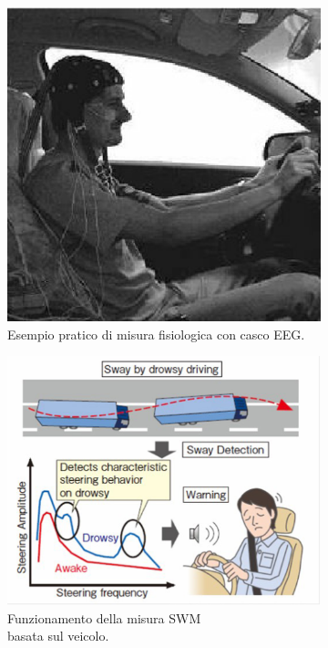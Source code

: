 \documentclass[12pt]{article}
\begin{document}
\begin{figure}
	\begin{subfigure}{.4\textwidth}
		\centering
		\includegraphics[width=.8\linewidth]{eps/eeg.eps}
		\caption{Esempio pratico di misura fisiologica con casco EEG.}
	\end{subfigure}
	\hspace{5mm}
	\begin{subfigure}{.55\textwidth}
		\centering
		\includegraphics[width=.8\linewidth]{eps/swm.eps}
		\caption{Funzionamento della misura SWM\\basata sul veicolo.}
	\end{subfigure}
	\par\bigskip %
	\begin{subfigure}{.55\textwidth}

\end{subfigure}
\end{figure}
\end{document}

